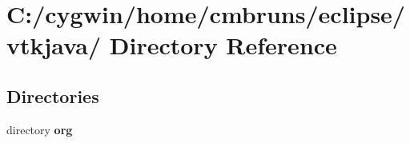 \section{C:/cygwin/home/cmbruns/eclipse/vtkjava/ Directory Reference}
\label{dir_000004}
\subsection*{Directories}
\begin{CompactItemize}
\item 
directory {\bf org}
\end{CompactItemize}

